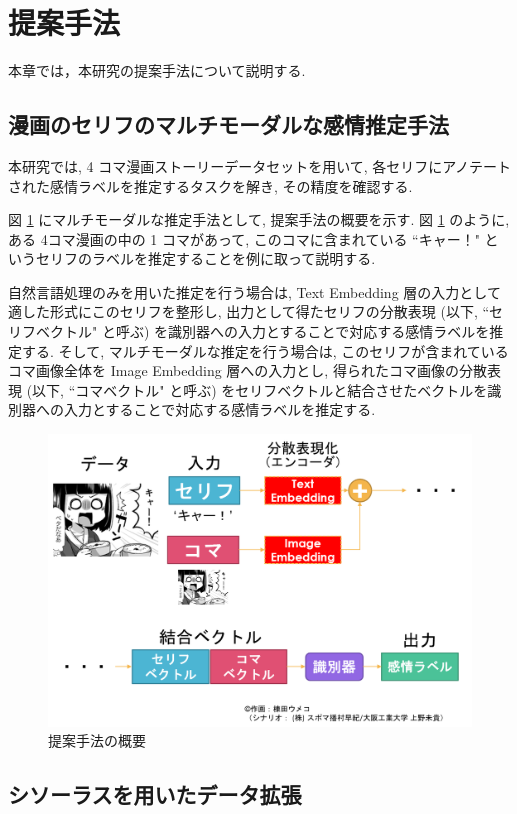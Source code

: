 \newpage
\changeindent{0cm}
\section{提案手法}
\changeindent{2cm}

本章では，本研究の提案手法について説明する.

\changeindent{0cm}
\subsection{漫画のセリフのマルチモーダルな感情推定手法}
\changeindent{2cm}

本研究では, 4 コマ漫画ストーリーデータセットを用いて,
各セリフにアノテートされた感情ラベルを推定するタスクを解き, その精度を確認する.

図 \ref{fig:teian} にマルチモーダルな推定手法として, 提案手法の概要を示す.
図 \ref{fig:teian} のように, ある 4コマ漫画の中の 1 コマがあって, このコマに含まれている ``キャー！" というセリフのラベルを推定することを例に取って説明する.

自然言語処理のみを用いた推定を行う場合は, Text Embedding 層の入力として適した形式にこのセリフを整形し, 出力として得たセリフの分散表現 (以下, ``セリフベクトル" と呼ぶ) を識別器への入力とすることで対応する感情ラベルを推定する. そして, マルチモーダルな推定を行う場合は, このセリフが含まれているコマ画像全体を Image Embedding 層への入力とし, 得られたコマ画像の分散表現 (以下, ``コマベクトル" と呼ぶ) をセリフベクトルと結合させたベクトルを識別器への入力とすることで対応する感情ラベルを推定する.

\begin{figure}[h]
  \centering
  \includegraphics[width=0.7\hsize]{doc/figures/teian_2.png}
  \caption{提案手法の概要}
  \label{fig:teian}
\end{figure}

\newpage
\changeindent{0cm}
\subsection{シソーラスを用いたデータ拡張}
\changeindent{2cm}

